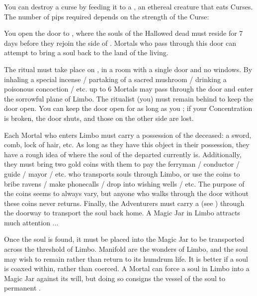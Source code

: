 You can destroy a curse by feeding it to a , an ethereal creature that eats Curses.  The number of pips required depends on the strength of the Curse:




\newpage


\OCCULT[
  Name=Katabasis,
  Link=occultism-katabasis,
  Pips=20,
  Time=Days
]


You open the door to , where the souls of the Hallowed dead must reside for 7 days before they rejoin the side of \TheAuthority. Mortals who pass through this door can attempt to bring a soul back to the land of the living.

The ritual must take place on , in a room with a single door and no windows. By inhaling a special incense / partaking of a sacred mushroom / drinking a poisonous concoction / etc. up to 6 Mortals may pass through the door and enter the sorrowful plane of Limbo. The ritualist (you) must remain behind to keep the door open. You can keep the door open for as long as you ; if your Concentration is broken, the door shuts, and those on the other side are lost.

Each Mortal who enters Limbo must carry a possession of the deceased: a sword, comb, lock of hair, etc. As long as they have this object in their possession, they have a rough idea of where the soul of the departed currently is. Additionally, they must bring two gold coins with them to pay the ferryman / conductor / guide / mayor / etc. who transports souls through Limbo, or use the coins to bribe ravens / make phonecalls / drop into wishing wells / etc.  The purpose of the coins seems to always vary, but anyone who walks through the door without these coins never returns. Finally, the Adventurers must carry a  (see ) through the doorway to transport the soul back home. A Magic Jar in Limbo attracts much attention ...

Once the soul is found, it must be placed into the Magic Jar to be transported across the threshold of Limbo. Manifold are the wonders of Limbo, and the soul may wish to remain rather than return to its humdrum life. It is better if a soul is coaxed within, rather than coerced. A Mortal can force a soul in Limbo into a Magic Jar against its will, but doing so consigns the vessel of the soul to permanent .

